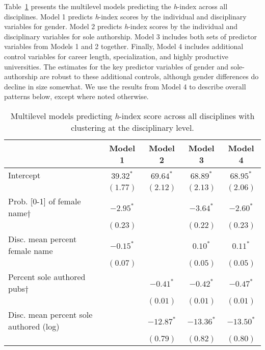 \documentclass[
  10pt,
  letterpaper,
]{article}
\begin{document}
Table~\ref{tbl-models-full} presents the multilevel models predicting
the \emph{h}-index across all disciplines. Model 1 predicts
\emph{h}-index scores by the individual and disciplinary variables for
gender. Model 2 predicts \emph{h}-index scores by the individual and
disciplinary variables for sole authorship. Model 3 includes both sets
of predictor variables from Models 1 and 2 together. Finally, Model 4
includes additional control variables for career length, specialization,
and highly productive universities. The estimates for the key predictor
variables of gender and sole-authorship are robust to these additional
controls, although gender differences do decline in size somewhat. We
use the results from Model 4 to describe overall patterns below, except
where noted otherwise.

\hypertarget{tbl-models-full}{}
\begin{table}[!t]
\caption{\label{tbl-models-full}Multilevel models predicting \emph{h}-index score across all disciplines
with clustering at the disciplinary level. }
\begin{center}
\begin{tabular}{l c c c c}
\hline
 & Model 1 & Model 2 & Model 3 & Model 4 \\
\hline
Intercept                               & $39.32^{*}$ & $69.64^{*}$  & $68.89^{*}$  & $68.95^{*}$  \\
                                        & $(1.77)$    & $(2.12)$     & $(2.13)$     & $(2.06)$     \\
Prob. [0-1] of female name$\dagger$     & $-2.95^{*}$ &              & $-3.64^{*}$  & $-2.60^{*}$  \\
                                        & $(0.23)$    &              & $(0.22)$     & $(0.23)$     \\
Disc. mean percent female name          & $-0.15^{*}$ &              & $0.10^{*}$   & $0.11^{*}$   \\
                                        & $(0.07)$    &              & $(0.05)$     & $(0.05)$     \\
Percent sole authored pubs$\dagger$     &             & $-0.41^{*}$  & $-0.42^{*}$  & $-0.47^{*}$  \\
                                        &             & $(0.01)$     & $(0.01)$     & $(0.01)$     \\
Disc. mean percent sole authored (log)  &             & $-12.87^{*}$ & $-13.36^{*}$ & $-13.50^{*}$ \\
                                        &             & $(0.79)$     & $(0.82)$     & $(0.80)$     \\

\end{tabular}
\end{center}
\end{table}
\end{document}
